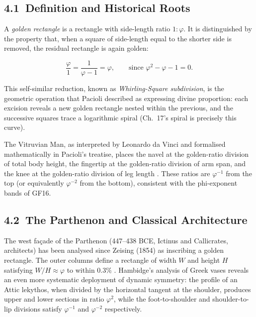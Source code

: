 \subsection{4.1\ Definition and Historical
  Roots}\label{subsec:ch30-golden-rect-def}

A \emph{golden rectangle} is a rectangle with
side-length ratio \(1 : \varphi\).  It is
distinguished by the property that, when a square
of side-length equal to the shorter side is
removed, the residual rectangle is again golden:

\[\frac{\varphi}{1} = \frac{1}{\varphi - 1}
  = \varphi,
  \qquad \text{since } \varphi^{2} - \varphi - 1 = 0.\]

This self-similar reduction, known as
\emph{Whirling-Square subdivision}, is the
geometric operation that Pacioli
\cite{pacioli_divina} described as expressing
divine proportion: each excision reveals a new
golden rectangle nested within the previous, and
the successive squares trace a logarithmic spiral
(Ch.~17's spiral is precisely this curve).

The Vitruvian Man, as interpreted by Leonardo da
Vinci and formalised mathematically in Pacioli's
treatise, places the navel at the golden-ratio
division of total body height, the fingertip at
the golden-ratio division of arm span, and the
knee at the golden-ratio division of leg length
\cite{pacioli_divina}.  These ratios are
$\varphi^{-1}$ from the top (or equivalently
$\varphi^{-2}$ from the bottom), consistent with
the phi-exponent bands of GF16.

\subsection{4.2\ The Parthenon and Classical
  Architecture}\label{subsec:ch30-parthenon}

The west fa\c{c}ade of the Parthenon (447--438 BCE,
Ictinus and Callicrates, architects) has been
analysed since Zeising (1854) as inscribing a
golden rectangle.  The outer columns define a
rectangle of width $W$ and height $H$ satisfying
$W / H \approx \varphi$ to within $0.3\%$
\cite{hambidge_dynamic_symmetry}.  Hambidge's
analysis of Greek vases reveals an even more
systematic deployment of dynamic symmetry: the
profile of an Attic lekythos, when divided by the
horizontal tangent at the shoulder, produces
upper and lower sections in ratio $\varphi^2$,
while the foot-to-shoulder and shoulder-to-lip
divisions satisfy $\varphi^{-1}$ and $\varphi^{-2}$
respectively.

